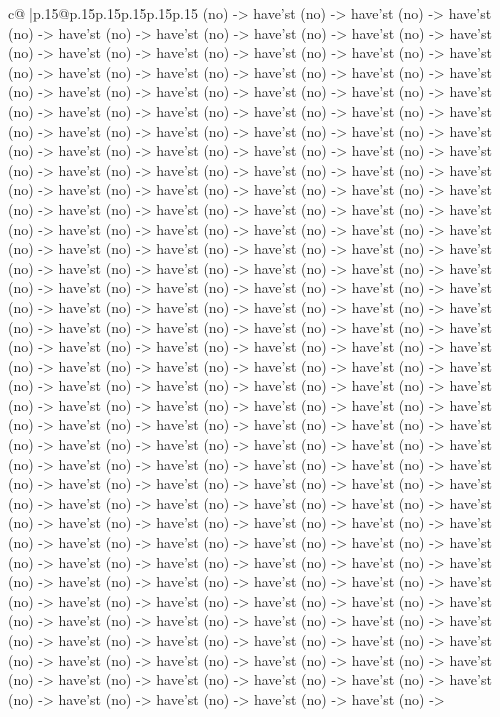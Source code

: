 \documentclass{article}
\begin{document}
{\begin{supertabular}{c@{$\;$}|p{.15\linewidth}@{}p{.15\linewidth}p{.15\linewidth}p{.15\linewidth}p{.15\linewidth}p{.15\linewidth}}
{{{(no) {-}> have'st (no) {-}> have'st (no) {-}> have'st (no) {-}> have'st (no) {-}> have'st (no) {-}> have'st (no) {-}> have'st (no) {-}> have'st (no) {-}> have'st (no) {-}> have'st (no) {-}> have'st (no) {-}> have'st (no) {-}> have'st (no) {-}> have'st (no) {-}> have'st (no) {-}> have'st (no) {-}> have'st (no) {-}> have'st (no) {-}> have'st (no) {-}> have'st (no) {-}> have'st (no) {-}> have'st (no) {-}> have'st (no) {-}> have'st (no) {-}> have'st (no) {-}> have'st (no) {-}> have'st (no) {-}> have'st (no) {-}> have'st (no) {-}> have'st (no) {-}> have'st (no) {-}> have'st (no) {-}> have'st (no) {-}> have'st (no) {-}> have'st (no) {-}> have'st (no) {-}> have'st (no) {-}> have'st (no) {-}> have'st (no) {-}> have'st (no) {-}> have'st (no) {-}> have'st (no) {-}> have'st (no) {-}> have'st (no) {-}> have'st (no) {-}> have'st (no) {-}> have'st (no) {-}> have'st (no) {-}> have'st (no) {-}> have'st (no) {-}> have'st (no) {-}> have'st (no) {-}> have'st (no) {-}> have'st (no) {-}> have'st (no) {-}> have'st (no) {-}> have'st (no) {-}> have'st (no) {-}> have'st (no) {-}> have'st (no) {-}> have'st (no) {-}> have'st (no) {-}> have'st (no) {-}> have'st (no) {-}> have'st (no) {-}> have'st (no) {-}> have'st (no) {-}> have'st (no) {-}> have'st (no) {-}> have'st (no) {-}> have'st (no) {-}> have'st (no) {-}> have'st (no) {-}> have'st (no) {-}> have'st (no) {-}> have'st (no) {-}> have'st (no) {-}> have'st (no) {-}> have'st (no) {-}> have'st (no) {-}> have'st (no) {-}> have'st (no) {-}> have'st (no) {-}> have'st (no) {-}> have'st (no) {-}> have'st (no) {-}> have'st (no) {-}> have'st (no) {-}> have'st (no) {-}> have'st (no) {-}> have'st (no) {-}> have'st (no) {-}> have'st (no) {-}> have'st (no) {-}> have'st (no) {-}> have'st (no) {-}> have'st (no) {-}> have'st (no) {-}> have'st (no) {-}> have'st (no) {-}> have'st (no) {-}> have'st (no) {-}> have'st (no) {-}> have'st (no) {-}> have'st (no) {-}> have'st (no) {-}> have'st (no) {-}> have'st (no) {-}> have'st (no) {-}> have'st (no) {-}> have'st (no) {-}> have'st (no) {-}> have'st (no) {-}> have'st (no) {-}> have'st (no) {-}> have'st (no) {-}> have'st (no) {-}> have'st (no) {-}> have'st (no) {-}> have'st (no) {-}> have'st (no) {-}> have'st (no) {-}> have'st (no) {-}> have'st (no) {-}> have'st (no) {-}> have'st (no) {-}> have'st (no) {-}> have'st (no) {-}> have'st (no) {-}> have'st (no) {-}> have'st (no) {-}> have'st (no) {-}> have'st (no) {-}> have'st (no) {-}> have'st (no) {-}> have'st (no) {-}> have'st (no) {-}> have'st (no) {-}> have'st (no) {-}> have'st (no) {-}> have'st (no) {-}> have'st (no) {-}> have'st (no) {-}> have'st (no) {-}> have'st (no) {-}> have'st (no) {-}> have'st (no) {-}> have'st (no) {-}> have'st (no) {-}> have'st (no) {-}> have'st (no) {-}> have'st (no) {-}> have'st (no) {-}> have'st (no) {-}> have'st (no) {-}> have'st (no) {-}> have'st (no) {-}> have'st (no) {-}> have'st (no) {-}> have'st (no) {-}> have'st (no) {-}> have'st (no) {-}> have'st (no) {-}> have'st (no) {-}> have'st (no) {-}> have'st (no) {-}> have'st (no) {-}> have'st (no) {-}> have'st (no) {-}> have'st (no) {-}> have'st (no) {-}> have'st (no) {-}> have'st (no) {-}> have'st (no) {-}> have'st (no) {-}> have'st (no) {-}> have'st (no) {-}> }}}
\end{supertabular}}
\end{document}
